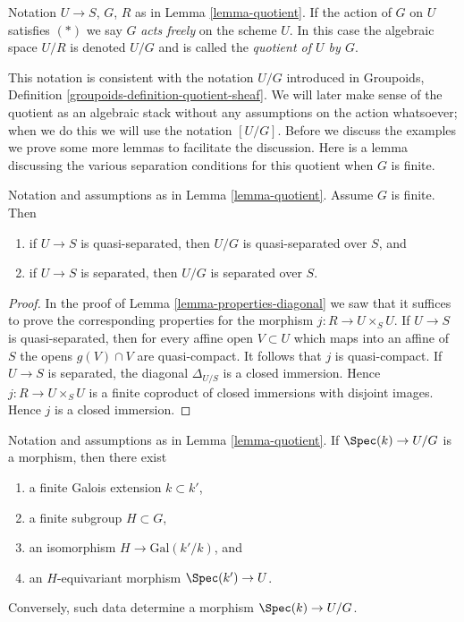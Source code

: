 \begin{definition}
\label{definition-quotient}
Notation $U \to S$, $G$, $R$ as in Lemma \ref{lemma-quotient}.
If the action of $G$ on $U$ satisfies $(*)$ we say $G$ {\it acts freely}
on the scheme $U$. In this case the algebraic space $U/R$ is denoted
$U/G$ and is called the {\it quotient of $U$ by $G$}.
\end{definition}

\noindent
This notation is consistent with the notation $U/G$ introduced in
Groupoids, Definition \ref{groupoids-definition-quotient-sheaf}.
We will later make sense of the quotient as an algebraic stack without
any assumptions on the action whatsoever; when we do this we will use the
notation $[U/G]$. Before we discuss the examples we prove
some more lemmas to facilitate the discussion. Here is a lemma discussing the
various separation conditions for this quotient when $G$ is finite.

\begin{lemma}
\label{lemma-quotient-finite-separated}
Notation and assumptions as in Lemma \ref{lemma-quotient}.
Assume $G$ is finite. Then
\begin{enumerate}
\item if $U \to S$ is quasi-separated, then $U/G$ is quasi-separated
over $S$, and
\item if $U \to S$ is separated, then $U/G$ is separated over $S$.
\end{enumerate}
\end{lemma}

\begin{proof}
In the proof of Lemma \ref{lemma-properties-diagonal}
we saw that it suffices to prove the
corresponding properties for the morphism $j : R \to U \times_S U$.
If $U \to S$ is quasi-separated, then for every affine open $V \subset U$
which maps into an affine of $S$
the opens $g(V) \cap V$ are quasi-compact. It follows that $j$ is
quasi-compact.
If $U \to S$ is separated, the diagonal $\Delta_{U/S}$ is a closed
immersion. Hence $j : R \to U \times_S U$ is a finite coproduct
of closed immersions with disjoint images. Hence $j$ is a closed immersion.
\end{proof}

\begin{lemma}
\label{lemma-quotient-field-map}
Notation and assumptions as in Lemma \ref{lemma-quotient}.
If $\Spec(k) \to U/G$ is a morphism, then there exist
\begin{enumerate}
\item a finite Galois extension $k \subset k'$,
\item a finite subgroup $H \subset G$,
\item an isomorphism $H \to \text{Gal}(k'/k)$, and
\item an $H$-equivariant morphism $\Spec(k') \to U$.
\end{enumerate}
Conversely, such data determine a morphism $\Spec(k) \to U/G$.
\end{lemma}

